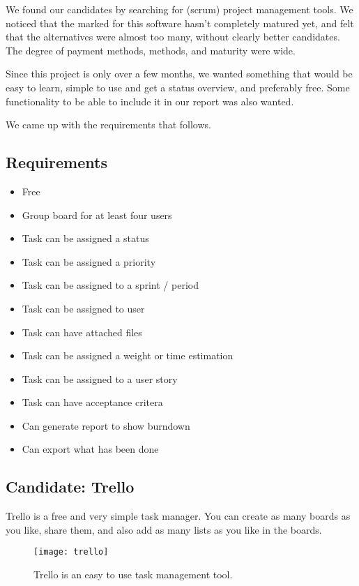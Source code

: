 \documentclass{report}
\begin{document}
We found our candidates by searching for (scrum) project management tools. We noticed that the marked for this software hasn’t completely matured yet, and felt that the alternatives were almost too many, without clearly better candidates. The degree of payment methods, methods, and maturity were wide.

Since this project is only over a few months, we wanted something that would be easy to learn, simple to use and get a status overview, and preferably free. Some functionality to be able to include it in our report was also wanted.

We came up with the requirements that follows.

\subsection{Requirements}\label{sec:project_managament_requirements}
\begin{itemize}
\item Free
\item Group board for at least four users
\item Task can be assigned a status
\item Task can be assigned a priority
\item Task can be assigned to a sprint / period
\item Task can be assigned to user 
\item Task can have attached files
\item Task can be assigned a weight or time estimation
\item Task can be assigned to a user story
\item Task can have acceptance critera
\item Can generate report to show burndown
\item Can export what has been done
\end{itemize}

\newpage
\subsection{Candidate: Trello}

Trello\cite{website:trello} is a free and very simple task manager. You can create as many boards as you like, share them, and also add as many lists as you like in the boards. 

\begin{figure}[H]
    \centering
    \texttt{[image: trello]}
    \caption{Trello is an easy to use task management tool.}  
    \label{fig:trello}
\end{figure}
\end{document}
